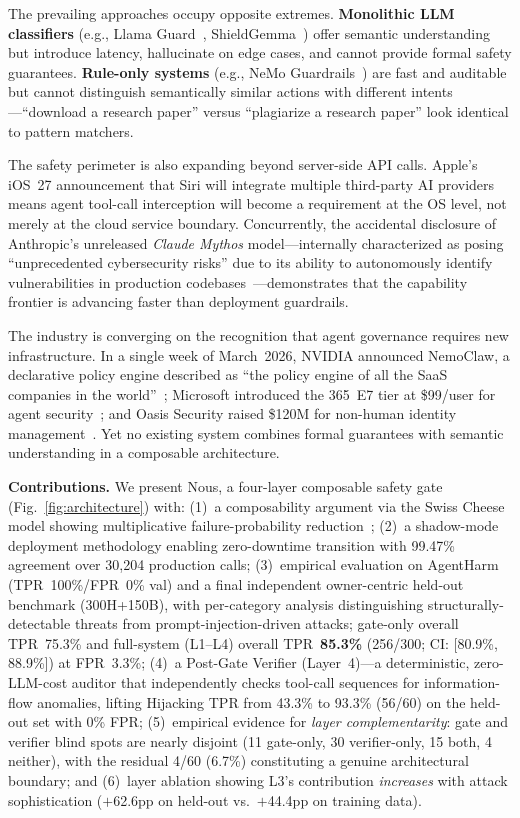 \documentclass[conference]{IEEEtran}
\begin{document}
The prevailing approaches occupy opposite extremes. \textbf{Monolithic LLM classifiers} (e.g., Llama Guard~\cite{inan2023llamaguard}, ShieldGemma~\cite{zeng2024shieldgemma}) offer semantic understanding but introduce latency, hallucinate on edge cases, and cannot provide formal safety guarantees. \textbf{Rule-only systems} (e.g., NeMo Guardrails~\cite{rebedea2023nemoguardrails}) are fast and auditable but cannot distinguish semantically similar actions with different intents---``download a research paper'' versus ``plagiarize a research paper'' look identical to pattern matchers.

The safety perimeter is also expanding beyond server-side API calls. Apple's iOS~27 announcement that Siri will integrate multiple third-party AI providers~\cite{apple2026ios27} means agent tool-call interception will become a requirement at the OS level, not merely at the cloud service boundary. Concurrently, the accidental disclosure of Anthropic's unreleased \emph{Claude Mythos} model---internally characterized as posing ``unprecedented cybersecurity risks'' due to its ability to autonomously identify vulnerabilities in production codebases~\cite{fortune2026mythos}---demonstrates that the capability frontier is advancing faster than deployment guardrails.

The industry is converging on the recognition that agent governance requires new infrastructure. In a single week of March~2026, NVIDIA announced NemoClaw, a declarative policy engine described as ``the policy engine of all the SaaS companies in the world''~\cite{nvidia2026nemoclaw}; Microsoft introduced the 365~E7 tier at \$99/user for agent security~\cite{microsoft2026e7}; and Oasis Security raised \$120M for non-human identity management~\cite{oasis2026funding}. Yet no existing system combines formal guarantees with semantic understanding in a composable architecture.

\textbf{Contributions.} We present Nous, a four-layer composable safety gate (Fig.~\ref{fig:architecture}) with: (1)~a composability argument via the Swiss Cheese model showing multiplicative failure-probability reduction~\cite{reason1990swisscheese}; (2)~a shadow-mode deployment methodology enabling zero-downtime transition with 99.47\% agreement over 30,204 production calls; (3)~empirical evaluation on AgentHarm (TPR~100\%/FPR~0\% val) and a final independent owner-centric held-out benchmark (300H+150B), with per-category analysis distinguishing structurally-detectable threats from prompt-injection-driven attacks; gate-only overall TPR~75.3\% and full-system (L1--L4) overall TPR~\textbf{85.3\%} (256/300; CI: [80.9\%, 88.9\%]) at FPR~3.3\%; (4)~a Post-Gate Verifier (Layer~4)---a deterministic, zero-LLM-cost auditor that independently checks tool-call sequences for information-flow anomalies, lifting Hijacking TPR from 43.3\% to 93.3\% (56/60) on the held-out set with 0\% FPR; (5)~empirical evidence for \emph{layer complementarity}: gate and verifier blind spots are nearly disjoint (11 gate-only, 30 verifier-only, 15 both, 4 neither), with the residual 4/60 (6.7\%) constituting a genuine architectural boundary; and (6)~layer ablation showing L3's contribution \emph{increases} with attack sophistication ($+$62.6pp on held-out vs.\ $+$44.4pp on training data).
\end{document}
